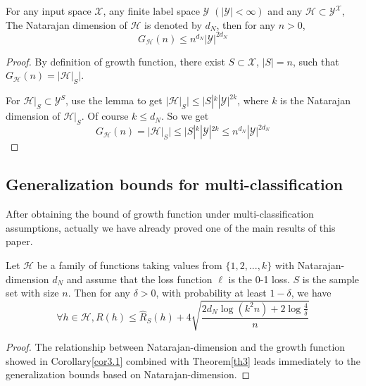 \begin{corollary}\label{cor3.1}
	For any input space $\mathcal{X}$, any finite label space $\mathcal{Y}$ $(|\mathcal{Y}|< \infty)$ and any $\mathcal{H} \subset \mathcal{Y}^{\mathcal{X}}$, The Natarajan dimension of $\mathcal{H}$ is denoted by $d_N$, then for any $n>0$,
	\begin{equation}
	G_{\mathcal{H}}(n) \leq n^{d_N}|\mathcal{Y}|^{2d_N}
	\end{equation}
\end{corollary}
\begin{proof}
	By definition of growth function, there exist $S\subset \mathcal{X}$, $|S|=n$, such that $	G_{\mathcal{H}}(n)= |\mathcal{H}|_S|$.
	
	For $\mathcal{H}|_S \subset \mathcal{Y}^S$, use the lemma to get $|\mathcal{H}|_S| \leq |S|^k|\mathcal{Y}|^{2k}$, where $k$ is the Natarajan dimension of $\mathcal{H}|_S$. Of course $k\leq d_N$. So we get
	\begin{equation}
	G_{\mathcal{H}}(n)= |\mathcal{H}|_S| \leq |S|^k|\mathcal{Y}|^{2k} \leq n^{d_N}|\mathcal{Y}|^{2d_N}
	\end{equation}
\end{proof}
\subsection{Generalization bounds for multi-classification}
After obtaining the bound of growth function under multi-classification assumptions, actually we have already proved one of the main results of this paper.

\begin{theorem}
	Let $\mathcal{H}$ be a family of functions taking values from $\{1,2,...,k\}$ with Natarajan-dimension $d_N$ and assume that the loss function $\ell$ is the 0-1 loss. $S$ is the sample set with size $n$. Then for any $\delta>0$, with probability at least $1-\delta$, we have
	\begin{equation}
	\forall h \in \mathcal{H}, R(h) \leq \hat{R}_S(h)+4\sqrt{\frac{2d_N\log(k^2n)+2\log\frac{4}{\delta}}{n}}
	\end{equation}
\end{theorem}
\begin{proof}
	The relationship between Natarajan-dimension and the growth function showed in Corollary\ref{cor3.1} combined with Theorem\ref{th3} leads immediately to the generalization bounds based on Natarajan-dimension.
\end{proof}

